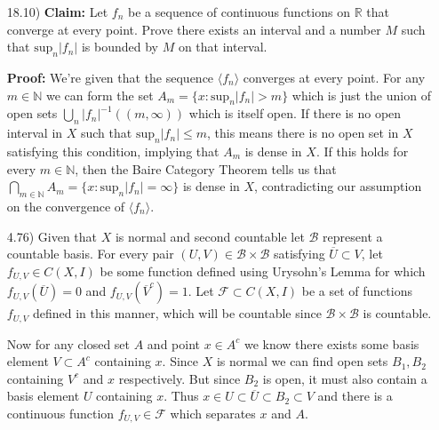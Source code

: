 \documentclass[11pt,letter]{article}
\begin{document}
\begin{enumerate}
    \item[18.10)] \textbf{Claim:} Let $f_n$ be a sequence of continuous functions on $\mathbb R$ that converge at every point. Prove there exists an interval and a number $M$ such that $\text{sup}_n \vert f_n \vert$ is bounded by $M$ on that interval.
    
    \textbf{Proof:} We're given that the sequence $\langle f_n \rangle$ converges at every point. For any $m \in \mathbb N$ we can form the set $A_m = \{x:\text{sup}_n \vert f_n \vert > m\}$ which is just the union of open sets $\bigcup_n \vert f_n \vert^{-1}((m,\infty))$ which is itself open. If there is no open interval in $X$ such that  $\text{sup}_n \vert f_n \vert \le m$, this means there is no open set in $X$ satisfying this condition, implying  that $A_m$ is dense in $X$. If this holds for every $m \in \mathbb N$, then the Baire Category Theorem tells us that $\bigcap_{m \in \mathbb N} A_m = \{x:\text{sup}_n \vert f_n \vert = \infty\}$ is dense in $X$, contradicting our assumption on the convergence of $\langle f_n \rangle$.
    
    \item[4.76)] Given that $X$ is normal and second countable let $\mathcal{B}$ represent a countable basis. For every pair $(U,V) \in \mathcal{B} \times \mathcal{B}$ satisfying $\overline{U} \subset V$, let $f_{U,V} \in C(X,I)$ be some function defined using Urysohn's Lemma for which $f_{U,V}(\overline{U}) = 0$ and $f_{U,V}(\overline{V}^c) = 1$. Let $\mathcal{F} \subset C(X,I)$ be a set of functions $f_{U,V}$ defined in this manner, which will be countable since $\mathcal{B} \times \mathcal{B}$ is countable.
    
    Now for any closed set $A$ and point $x \in A^c$ we know there exists some basis element $V \subset A^c$ containing $x$. Since $X$ is normal we can find open sets $B_1, B_2$ containing $V^c$ and $x$ respectively. But since $B_2$ is open, it must also contain a basis element $U$ containing $x$. Thus $x \in U \subset \overline{U} \subset B_2 \subset V$ and there is a continuous function $f_{U,V} \in \mathcal{F}$ which separates $x$ and $A$.     
    

\end{enumerate}
\end{document}
